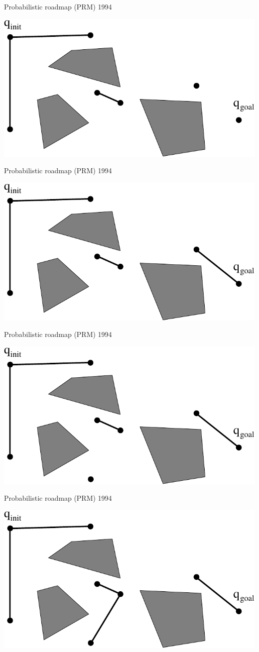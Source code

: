 \begin{frame} {Probabilistic roadmap (PRM) 1994}
\centerline {
  \includegraphics[width=.8\linewidth]{figures/PRM11.pdf}
}
\end{frame}

\begin{frame} {Probabilistic roadmap (PRM) 1994}
\centerline {
  \includegraphics[width=.8\linewidth]{figures/PRM12.pdf}
}
\end{frame}

\begin{frame} {Probabilistic roadmap (PRM) 1994}
\centerline {
  \includegraphics[width=.8\linewidth]{figures/PRM13.pdf}
}
\end{frame}

\begin{frame} {Probabilistic roadmap (PRM) 1994}
\centerline {
  \includegraphics[width=.8\linewidth]{figures/PRM14.pdf}
}
\end{frame}

